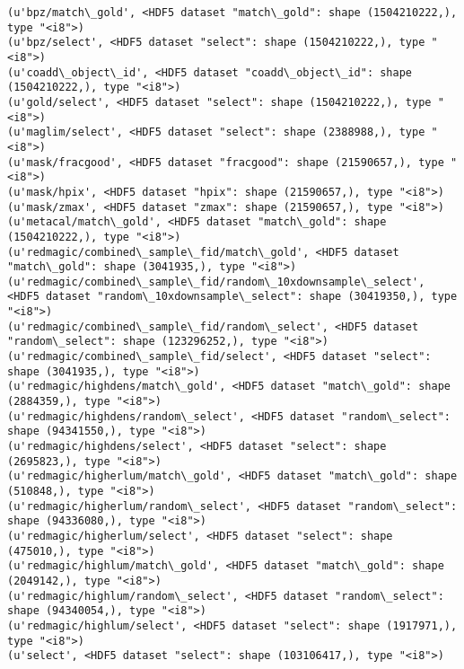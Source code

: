 \documentclass[11pt]{article}
\begin{document}
    \begin{Verbatim}[commandchars=\\\{\}]
(u'bpz/match\_gold', <HDF5 dataset "match\_gold": shape (1504210222,), type "<i8">)
(u'bpz/select', <HDF5 dataset "select": shape (1504210222,), type "<i8">)
(u'coadd\_object\_id', <HDF5 dataset "coadd\_object\_id": shape (1504210222,), type "<i8">)
(u'gold/select', <HDF5 dataset "select": shape (1504210222,), type "<i8">)
(u'maglim/select', <HDF5 dataset "select": shape (2388988,), type "<i8">)
(u'mask/fracgood', <HDF5 dataset "fracgood": shape (21590657,), type "<i8">)
(u'mask/hpix', <HDF5 dataset "hpix": shape (21590657,), type "<i8">)
(u'mask/zmax', <HDF5 dataset "zmax": shape (21590657,), type "<i8">)
(u'metacal/match\_gold', <HDF5 dataset "match\_gold": shape (1504210222,), type "<i8">)
(u'redmagic/combined\_sample\_fid/match\_gold', <HDF5 dataset "match\_gold": shape (3041935,), type "<i8">)
(u'redmagic/combined\_sample\_fid/random\_10xdownsample\_select', <HDF5 dataset "random\_10xdownsample\_select": shape (30419350,), type "<i8">)
(u'redmagic/combined\_sample\_fid/random\_select', <HDF5 dataset "random\_select": shape (123296252,), type "<i8">)
(u'redmagic/combined\_sample\_fid/select', <HDF5 dataset "select": shape (3041935,), type "<i8">)
(u'redmagic/highdens/match\_gold', <HDF5 dataset "match\_gold": shape (2884359,), type "<i8">)
(u'redmagic/highdens/random\_select', <HDF5 dataset "random\_select": shape (94341550,), type "<i8">)
(u'redmagic/highdens/select', <HDF5 dataset "select": shape (2695823,), type "<i8">)
(u'redmagic/higherlum/match\_gold', <HDF5 dataset "match\_gold": shape (510848,), type "<i8">)
(u'redmagic/higherlum/random\_select', <HDF5 dataset "random\_select": shape (94336080,), type "<i8">)
(u'redmagic/higherlum/select', <HDF5 dataset "select": shape (475010,), type "<i8">)
(u'redmagic/highlum/match\_gold', <HDF5 dataset "match\_gold": shape (2049142,), type "<i8">)
(u'redmagic/highlum/random\_select', <HDF5 dataset "random\_select": shape (94340054,), type "<i8">)
(u'redmagic/highlum/select', <HDF5 dataset "select": shape (1917971,), type "<i8">)
(u'select', <HDF5 dataset "select": shape (103106417,), type "<i8">)

    \end{Verbatim}
\end{document}
